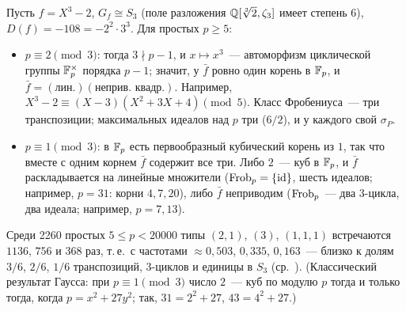\begin{example}[4.28d: $X^3-2$]
Пусть $f=X^3-2$, $G_f\cong S_3$ (поле разложения $\mathbb Q[\sqrt[3]2,\zeta_3]$ имеет степень $6$), $D(f)=-108=-2^2\cdot3^3$.
Для простых $p\ge5$:
\begin{itemize}[leftmargin=*]
\item $p\equiv2\pmod3$: тогда $3\nmid p-1$, и $x\mapsto x^3$~--- автоморфизм циклической группы $\mathbb F_p^\times$ порядка $p-1$;
значит, у $\bar f$ ровно один корень в $\mathbb F_p$, и $\bar f=(\text{лин.})(\text{неприв. квадр.})$. Например,
$X^3-2\equiv(X-3)(X^2+3X+4)\pmod5$. Класс Фробениуса~--- три транспозиции; максимальных идеалов над $p$ три
($6/2$), и у каждого свой $\sigma_P$.
\item $p\equiv1\pmod3$: в $\mathbb F_p$ есть первообразный кубический корень из $1$, так что вместе с одним корнем $\bar f$
содержит все три. Либо $2$~--- куб в $\mathbb F_p$, и $\bar f$ раскладывается на линейные множители ($\operatorname{Frob}_p=\{\operatorname{id}\}$, шесть
идеалов; например, $p=31$: корни $4,7,20$), либо $\bar f$ неприводим ($\operatorname{Frob}_p$~--- два $3$-цикла, два идеала; например,
$p=7,13$).
\end{itemize}
Среди 2260 простых $5\le p<20000$ типы $(2,1)$, $(3)$, $(1,1,1)$ встречаются $1136$, $756$ и $368$ раз, т.\,е.\ с частотами
$\approx0{,}503$, $0{,}335$, $0{,}163$~--- близко к долям $3/6$, $2/6$, $1/6$ транспозиций, $3$-циклов и единицы в $S_3$
(ср.\ ). (Классический результат Гаусса: при $p\equiv1\pmod3$ число $2$~--- куб по модулю $p$ тогда и только тогда,
когда $p=x^2+27y^2$; так, $31=2^2+27$, $43=4^2+27$.)
\end{example}


